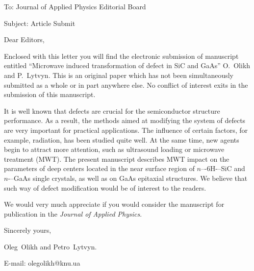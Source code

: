 \documentclass[preprint]{elsarticle}
\begin{document}
To:
Journal of Applied Physics Editorial Board


Subject:
Article Submit

\vspace{5mm}
Dear Editors,

\vspace{3mm}
Enclosed with this letter you will find the electronic submission of manuscript entitled
``Microwave induced transformation of defect in SiC and GaAs'' O.~Olikh  and P.~Lytvyn.
This is an original paper which has not been simultaneously submitted as a whole or in part anywhere else.
No conflict of interest exits in the submission of this manuscript.


It is well known that defects are crucial for the semiconductor structure performance.
As a result, the methods aimed at
modifying the system of defects are very important for practical applications.
The influence of certain factors, for example, radiation, has been studied quite well.
At the same time, new agents begin to attract more attention, such as ultrasound loading
or microwave treatment (MWT).
The present manuscript describes
 MWT impact on the parameters of deep centers located in the near surface region of $n$–-6H-–SiC and $n$-–GaAs single crystals,
as well as on  GaAs  epitaxial structures.
We believe that such way of defect modification would be of interest to the readers.

We would  very much appreciate if you would consider the manuscript for publication in the \emph{Journal of Applied Physics}.

\vspace{3mm}

Sincerely yours,

Oleg~Olikh and Petro~Lytvyn.

E-mail: olegolikh@knu.ua


\end{document}
